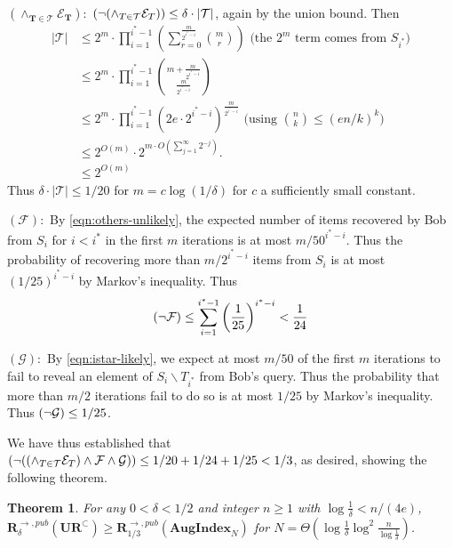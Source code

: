 \documentclass[11pt]{article}
\newtheorem{theorem}{Theorem}
\let\Pr\relax
\DeclareMathOperator*{\Pr}{\mathbb{P}}
\newcommand{\aug}{\mathbf{AugIndex}\xspace}
\newcommand{\ur}{\mathbf{UR}\xspace}
\newcommand{\randcom}{\mathbf{R}}
\begin{document}
\noindent $\mathbf{(\wedge_{T\in\mathcal T} \mathcal E_T):}$ $\Pr(\neg(\wedge_{T\in\mathcal T} \mathcal E_T)) \le \delta\cdot |\mathcal T|$, again by the union bound. Then
\allowdisplaybreaks
\begin{align*}
|\mathcal T| &\le 2^m \cdot \prod_{i=1}^{i^*-1}\left(\sum_{r=0}^{\frac m{2^{i^*-i}}} \binom mr\right)\text{ (the }2^m\text{ term comes from }S_{i^*}\text{)}\\
{}&\le 2^m \cdot \prod_{i=1}^{i^*-1} \binom{m + \frac m{2^{i^* - i}}}{\frac m{2^{i^* - i}}}\\
{}&\le 2^m \cdot \prod_{i=1}^{i^*-1} (2e\cdot 2^{i^*-i})^{\frac m{2^{i^* - i}}}\text{ (using }\binom nk \le (en/k)^k\textrm{)}\\
{}&\le 2^{O(m)} \cdot 2^{m\cdot O(\sum_{j=1}^\infty 2^{-j})} .\\
{}& \le 2^{O(m)}
\end{align*}
Thus $\delta \cdot |\mathcal T| \le 1/20$ for $m = c\log(1/\delta)$ for $c$ a sufficiently small constant.

\medskip

\noindent $\mathbf{(\mathcal F)}:$ By \eqref{eqn:others-unlikely}, the expected number of items recovered by Bob from $S_i$ for $i<i^*$ in the first $m$ iterations is at most $m/50^{i^*-i}$. Thus the probability of recovering more than $m/2^{i^*-i}$ items from $S_i$ is at most $(1/25)^{i^*-i}$ by Markov's inequality. Thus
$$
\Pr(\neg\mathcal F) \le \sum_{i=1}^{i^*-1}\left(\frac 1{25}\right)^{i^*-i} < \frac 1{24}
$$

\noindent $\mathbf{(\mathcal G)}:$ By \eqref{eqn:istar-likely}, we expect at most $m/50$ of the first $m$ iterations to fail to reveal an element of $S_i\backslash T_{i^*}$ from Bob's query. Thus the probability that more than $m/2$ iterations fail to do so is at most $1/25$ by Markov's inequality. Thus $\Pr(\neg\mathcal{G}) \le 1/25$.

\medskip

We have thus established that $\Pr(\neg((\wedge_{T\in\mathcal T} \mathcal E_T) \wedge \mathcal F\wedge \mathcal G)) \le 1/20 + 1/24 + 1/25 < 1/3$, as desired, showing the following theorem.

\begin{theorem}
For any $0<\delta<1/2$ and integer $n\ge 1$ with $\log \frac 1{\delta} < n/(4e)$, $\randcom^{\rightarrow,pub}_\delta(\ur^\subset) \ge \randcom^{\rightarrow,pub}_{1/3}(\aug_N)$ for $N = \Theta(\log\frac 1{\delta} \log^2 \frac n{\log \frac 1{\delta}})$.
\end{theorem}
\end{document}
